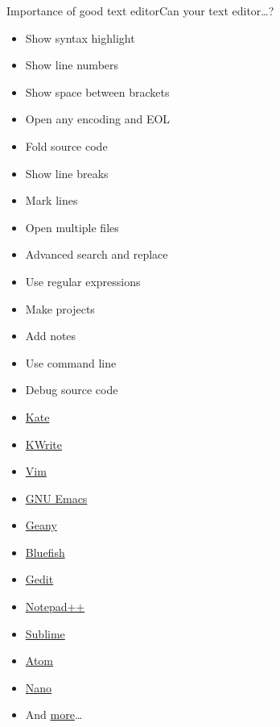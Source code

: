 \documentclass[compress, ucs, xelatex, 11pt, xcolor=svgnames,
  hyperref={
    bookmarks=true,
    unicode=true,
    colorlinks=true,
    pdftitle={Linux, command line and MetaCentrum},
    plainpages=false,
    pdfauthor={Vojtech Zeisek},
    pdfsubject={Course about use of Linux command line, writing shell scripts and using MetaCentrum of CESNET},
    pdfcreator={XeLaTeX},
    pdfkeywords={Linux, GNU, BASH, shell, command line, MetaCentrum},
    linkcolor=Red,
    anchorcolor=Blue,
    citecolor=Purple,
    filecolor=DodgerBlue,
    menucolor=DarkOrchid,
    urlcolor=DeepSkyBlue,
    pdftex},
  url={hyphens, lowtilde} %
  ]{beamer}
\begin{document}
\begin{frame}[label=editors]{Importance of good text editor}{Can your text editor\ldots ?}
\begin{multicols}{2}
  \begin{itemize}
    \item Show syntax highlight
    \item Show line numbers
    \item Show space between brackets
    \item Open any encoding and EOL
    \item Fold source code
    \item Show line breaks
    \item Mark lines
    \item Open multiple files
    \item Advanced search and replace
    \item Use regular expressions
    \item Make projects
    \item Add notes
    \item Use command line
    \item Debug source code
  \end{itemize}
\end{multicols}
\begin{multicols}{4}
  \begin{itemize}
    \item \href{http://kate-editor.org/}{Kate}
    \item \href{https://www.kde.org/applications/utilities/kwrite/}{KWrite}
    \item \href{http://www.vim.org/}{Vim}
    \item \href{https://en.wikipedia.org/wiki/Emacs}{GNU Emacs}
    \item \href{http://www.geany.org/}{Geany}
    \item \href{http://bluefish.openoffice.nl/index.html}{Bluefish}
    \item \href{https://wiki.gnome.org/Apps/Gedit}{Gedit}
    \item \href{https://notepad-plus-plus.org/}{Notepad++}
    \item \href{https://www.sublimetext.com/}{Sublime}
    \item \href{https://atom.io/}{Atom}
    \item \href{http://www.nano-editor.org/}{Nano}
    \item And \href{http://texteditors.org/cgi-bin/wiki.pl?PickingATextEditor}{more}\ldots
  \end{itemize}
\end{multicols}
\end{frame}
\end{document}
